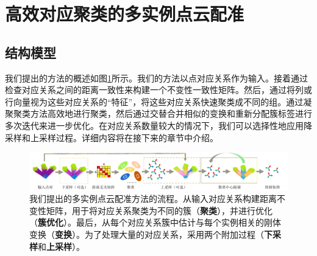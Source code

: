 \section{高效对应聚类的多实例点云配准}

\subsection{结构模型}
我们提出的方法的概述如图\ref{fig:multicluster}所示。我们的方法以点对应关系作为输入。接着通过检查对应关系之间的距离一致性来构建一个不变性一致性矩阵。然后，通过将列或行向量视为这些对应关系的“特征”，将这些对应关系快速聚类成不同的组。通过凝聚聚类方法高效地进行聚类，然后通过交替合并相似的变换和重新分配簇标签进行多次迭代来进一步优化。在对应关系数量较大的情况下，我们可以选择性地应用降采样和上采样过程。详细内容将在接下来的章节中介绍。

\begin{figure}[ht]
    \centering
    \includegraphics[width=1\textwidth]{images/multi-cluster.pdf} %
    \caption{我们提出的多实例点云配准方法的流程。从输入对应关系构建距离不变性矩阵，用于将对应关系聚类为不同的簇（\textbf{聚类}），并进行优化（\textbf{簇优化}）。最后，从每个对应关系簇中估计与每个实例相关的刚体变换（\textbf{变换}）。为了处理大量的对应关系，采用两个附加过程（\textbf{下采样}和\textbf{上采样}）。}
    \label{fig:multicluster}
    \vspace{-0.6in}
\end{figure}

